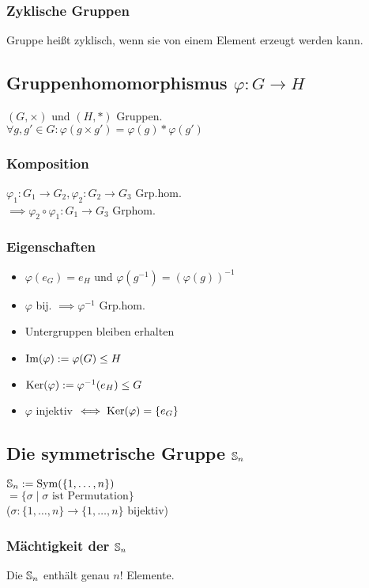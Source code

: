 \subsubsection*{Zyklische Gruppen}
Gruppe heißt zyklisch, wenn sie von einem Element erzeugt werden kann.

\subsection*{Gruppenhomomorphismus $\varphi:G \to H$}
$(G, \times)$ und $(H, *)$ Gruppen. \\
$\forall g,g'\in G: \varphi(g\times g')=\varphi(g) * \varphi(g')$

\subsubsection*{Komposition}
$\varphi_1: G_1 \to G_2,\varphi_2: G_2 \to G_3$ Grp.hom. \\
$\implies \varphi_2 \circ \varphi_1: G_1 \to G_3$ Grphom. 

\subsubsection*{Eigenschaften}
\begin{itemize}
	\item $\varphi(e_G)=e_H$ und $\varphi(g^{-1})=(\varphi(g))^{-1}$
	\item $\varphi$ bij. $\implies \varphi^{-1}$ Grp.hom.
	\item Untergruppen bleiben erhalten
	\item $\im(\varphi):=\varphi(G) \le H$
	\item $\Ker(\varphi) := \varphi^{-1}(e_H) \le G$
	\item $\varphi$ injektiv $\iff \Ker(\varphi)=\{e_G\}$
\end{itemize}

\subsection*{Die symmetrische Gruppe $\S_n$}
$\S_n := \Sym(\{1,\dots,n\})$\\
$=\{\sigma \mid \sigma \text{ ist Permutation}\}$\\
($\sigma : \{1,\dots,n\}\to\{1,\dots,n\}$ bijektiv)

\subsubsection*{Mächtigkeit der $\S_n$}
Die $\S_n$ enthält genau $n!$ Elemente.

